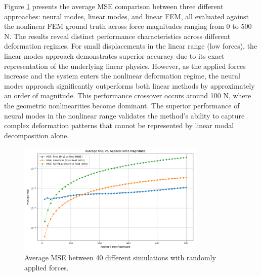 Figure \ref{fig:static_mse_comparison} presents the average MSE comparison between three different approaches: neural modes, linear modes, and linear FEM, all evaluated against the nonlinear FEM ground truth across force magnitudes ranging from 0 to 500 N. The results reveal distinct performance characteristics across different deformation regimes. For small displacements in the linear range (low forces), the linear modes approach demonstrates superior accuracy due to its exact representation of the underlying linear physics. However, as the applied forces increase and the system enters the nonlinear deformation regime, the neural modes approach significantly outperforms both linear methods by approximately an order of magnitude. This performance crossover occurs around 100 N, where the geometric nonlinearities become dominant. The superior performance of neural modes in the nonlinear range validates the method's ability to capture complex deformation patterns that cannot be represented by linear modal decomposition alone.

\begin{figure}[ht]
    \centering
    \includegraphics[width=0.8\textwidth]{Images/beam_static_mse.png}
    \caption{Average MSE between 40 different simulations with randomly applied forces.}
    \label{fig:static_mse_comparison}
\end{figure}

